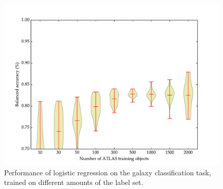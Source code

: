     \begin{figure}[!ht]
      \centering
      \includegraphics[width=\textwidth]{images/experiments/passive.pdf}
      \caption{Performance of logistic regression on the galaxy classification task, trained on different amounts of the \citeauthor{norris06} label set.}
    \end{figure}